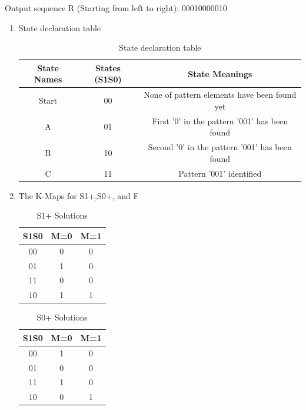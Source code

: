 \documentclass{article}
\begin{document}
\begin{enumerate}[label=(\alph*)]
    Output sequence R (Starting from left to right):  00010000010
\begin{enumerate}[label=(\roman*),nolistsep]
        \item State declaration table
        \begin{table}[h]
        \centering
        \begin{tabular}{|c|c|c|}
        \hline
        \textbf{State Names} & \textbf{States (S1S0)} & \textbf{State Meanings} \\\hline
        Start & 00 & None of pattern elements have been found yet \\\hline
        A & 01 & First '0' in the pattern '001' has been found \\\hline
        B & 10 & Second '0' in the pattern '001' has been found \\\hline
        C & 11 & Pattern '001' identified  \\
        \hline
        \end{tabular}
        \caption{State declaration table}
        \end{table}
        \item The K-Maps for S1+,S0+, and F
        \begin{table}[h]
        \centering
        \begin{tabular}{|c|c|c|}
        \hline
        S1S0 & M=0 & M=1 \\
        \hline
        00 & 0 & 0 \\
        01 & 1 & 0 \\
        11 & 0 & 0 \\
        10 & 1 & 1 \\
        \hline
        \end{tabular}
        \caption{S1+ Solutions}
        \end {table}
        
        \begin{table}[h]
        \centering
        \begin{tabular}{|c|c|c|}
        \hline
        S1S0 & M=0 & M=1 \\
        \hline
        00 & 1 & 0 \\
        01 & 0 & 0 \\
        11 & 1 & 0 \\
        10 & 0 & 1 \\
        \hline
        \end{tabular}
        \caption{S0+ Solutions}
        \end {table}
        

\end{enumerate}
\end{enumerate}
\end{document}
